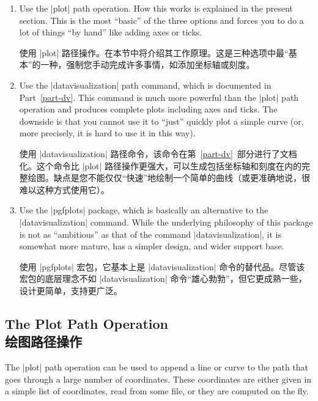 \begin{enumerate}
    \item Use the |plot| path operation. How this works is explained in the
        present section. This is the most ``basic'' of the three options and
        forces you to do a lot of things ``by hand'' like adding axes or ticks.

        使用 |plot| 路径操作。在本节中将介绍其工作原理。这是三种选项中最“基本”的一种，强制您手动完成许多事情，如添加坐标轴或刻度。

        \item Use the |datavisualization| path command, which is documented in
        Part~\ref{part-dv}. This command is much more powerful than the |plot|
        path operation and produces complete plots including axes and ticks.
        The downside is that you cannot use it to ``just'' quickly plot a
        simple curve (or, more precisely, it is hard to use it in this way).

        使用 |datavisualization| 路径命令，该命令在第~\ref{part-dv}~部分进行了文档化。这个命令比 |plot| 路径操作更强大，可以生成包括坐标轴和刻度在内的完整绘图。缺点是您不能仅仅“快速”地绘制一个简单的曲线（或更准确地说，很难以这种方式使用它）。

        \item Use the |pgfplots| package, which is basically an alternative to the
        |datavisualization| command. While the underlying philosophy of this
        package is not as ``ambitious'' as that of the command
        |datavisualization|, it is somewhat more mature, has a simpler design,
        and wider support base.

        使用 |pgfplots| 宏包，它基本上是 |datavisualization| 命令的替代品。尽管该宏包的底层理念不如 |datavisualization| 命令“雄心勃勃”，但它更成熟一些，设计更简单，支持更广泛。

    \end{enumerate}


\subsection{The Plot Path Operation\\绘图路径操作}

The |plot| path operation can be used to append a line or curve to the path
that goes through a large number of coordinates. These coordinates are either
given in a simple list of coordinates, read from some file, or they are
computed on the fly.

